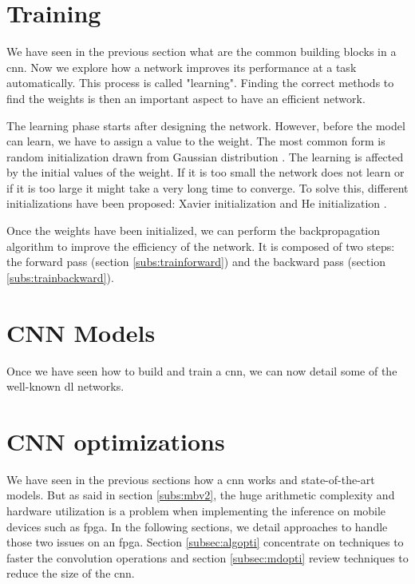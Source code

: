 \section{Training} \label{sec:train}
We have seen in the previous section what are the common building blocks in a \acrshort{cnn}. Now we explore how a network improves its performance at a task automatically. This process is called "learning". Finding the correct methods to find the weights is then an important aspect to have an efficient network.

The learning phase starts after designing the network. However, before the model can learn, we have to assign a value to the weight. The most common form is random initialization drawn from Gaussian distribution \cite{he_delving_2015}. The learning is affected by the initial values of the weight. If it is too small the network does not learn or if it is too large it might take a very long time to converge. To solve this, different initializations have been proposed: Xavier initialization \cite{glorot_understanding_2010} and He initialization \cite{he_delving_2015}.

Once the weights have been initialized, we can perform the backpropagation algorithm to improve the efficiency of the network. It is composed of two steps: the forward pass (section \ref{subs:trainforward}) and the backward pass (section \ref{subs:trainbackward}).
%
%

%

%
%
\section{CNN Models}
Once we have seen how to build and train a \acrshort{cnn}, we can now detail some of the well-known \acrshort{dl} networks.
%

%
%
\section{CNN optimizations}
%
%
We have seen in the previous sections how a \acrshort{cnn} works and state-of-the-art models. But as said in section \ref{subs:mbv2}, the huge arithmetic complexity and hardware utilization is a problem when implementing the inference on mobile devices such as \acrshort{fpga}. In the following sections, we detail approaches to handle those two issues on an \acrshort{fpga}. Section \ref{subsec:algopti} concentrate on techniques to faster the convolution operations and section \ref{subsec:mdopti} review techniques to reduce the size of the \acrshort{cnn}.
%

%


